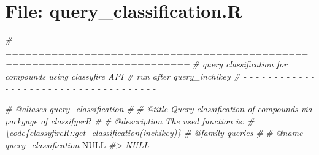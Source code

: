 \documentclass[
]{article}
\newenvironment{Shaded}{\begin{snugshade}}{\end{snugshade}}
\newcommand{\CommentTok}[1]{\textcolor[rgb]{0.56,0.35,0.01}{\textit{#1}}}
\newcommand{\ConstantTok}[1]{\textcolor[rgb]{0.00,0.00,0.00}{#1}}
\begin{document}
\hypertarget{file-query_classification.r}{%
\section{File: query\_classification.R}\label{file-query_classification.r}}

\begin{Shaded}
\begin{Highlighting}[]
\CommentTok{\# ==========================================================================}
\CommentTok{\# query classification for compounds using classyfire API}
\CommentTok{\# run after query\_inchikey}
\CommentTok{\# {-} {-} {-} {-} {-} {-} {-} {-} {-} {-} {-} {-} {-} {-} {-} {-} {-} {-} {-} {-} {-} {-} {-} {-} {-} {-} {-} {-} {-} {-} {-} {-} {-} {-} {-} {-} {-}}

\CommentTok{\#\textquotesingle{} @aliases query\_classification}
\CommentTok{\#\textquotesingle{}}
\CommentTok{\#\textquotesingle{} @title Query classification of compounds via packgage of \textquotesingle{}classifyerR\textquotesingle{}}
\CommentTok{\#\textquotesingle{}}
\CommentTok{\#\textquotesingle{} @description The used function is:}
\CommentTok{\#\textquotesingle{} \textbackslash{}code\{classyfireR::get\_classification(inchikey)\}}
\CommentTok{\#\textquotesingle{} @family queries}
\CommentTok{\#\textquotesingle{}}
\CommentTok{\#\textquotesingle{} @name query\_classification}
\ConstantTok{NULL}
\CommentTok{\#\textgreater{} NULL}


\end{Highlighting}
\end{Shaded}
\end{document}
